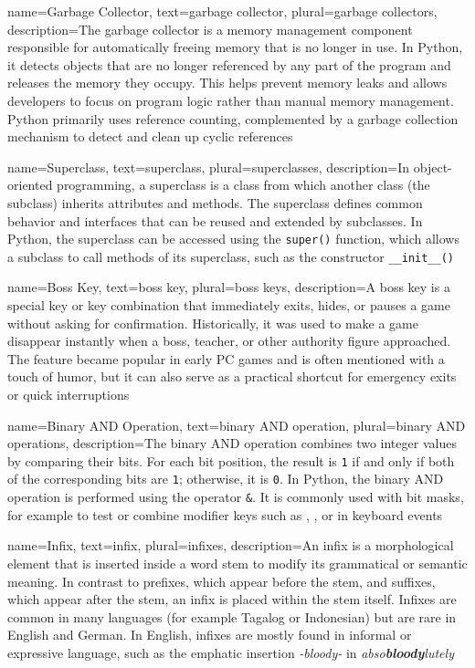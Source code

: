 {
	name={Garbage Collector},
	text={garbage collector},
	plural={garbage collectors},
	description={The garbage collector is a memory management component responsible for automatically freeing memory that is no longer in use. In Python, it detects objects that are no longer referenced by any part of the program and releases the memory they occupy. 	This helps prevent memory leaks and allows developers to focus on program logic rather than manual memory management. Python primarily uses reference counting, complemented by a garbage collection mechanism to detect and clean up cyclic references}
}

{
	name={Superclass},
	text={superclass},
	plural={superclasses},
	description={In object-oriented programming, a superclass is a class from which another class (the subclass) inherits attributes and methods. The superclass defines common behavior and interfaces that can be	reused and extended by subclasses. In Python, the superclass can be accessed using the \texttt{super()} function, which allows a subclass to call methods of its superclass, such as the constructor \texttt{\_\_init\_\_()}}
}

{
	name={Boss Key},
	text={boss key},
	plural={boss keys},
	description={A boss key is a special key or key combination that immediately exits, hides, or pauses a game without asking for confirmation. Historically, it was used to make a game disappear instantly when a boss, teacher, or other authority figure approached. The feature became popular in early PC games and is often mentioned	with a touch of humor, but it can also serve as a practical shortcut for emergency exits or quick interruptions}
}

{
	name={Binary AND Operation},
	text={binary AND operation},
	plural={binary AND operations},
	description={The binary AND operation combines two integer values by comparing their bits. For each bit position, the result is \texttt{1} if and only if both of the corresponding bits are \texttt{1}; otherwise, it is \texttt{0}. In Python, the binary AND operation is performed using the operator \texttt{\&}. It is commonly used with bit masks, for example to test or combine modifier keys such as \keys{\shift}, \keys{\ctrl}, or \keys{\Alt} in keyboard events}
}

{
	name={Infix},
	text={infix},
	plural={infixes},
	description={An infix is a morphological element that is inserted inside a word stem to modify its grammatical or semantic meaning. In contrast to prefixes, which appear 	before the stem, and suffixes, which appear after the stem, an infix is placed within the stem itself. Infixes are common in many languages (for example Tagalog or Indonesian) but are rare in English and German. In English, infixes are mostly found in informal or expressive language, such as the emphatic insertion \emph{-bloody-} in \emph{abso\textbf{bloody}lutely}}
}

